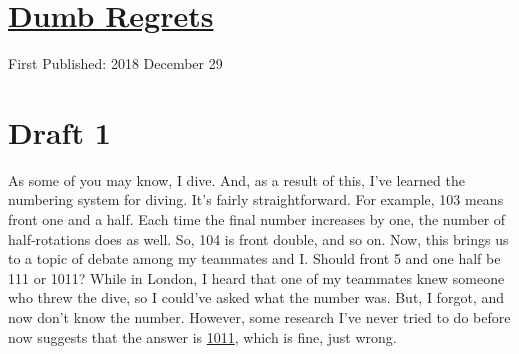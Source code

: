 \documentclass[12pt]{article}[titlepage]
\newcommand{\1}{\={a}}
\newcommand{\2}{\={e}}
\newcommand{\3}{\={\i}}
\newcommand{\4}{\=o}
\newcommand{\5}{\=u}
\newcommand{\6}{\={A}}
\renewcommand{\,}{\textsuperscript{,}}
\begin{document}
\doublespacing
\section{\href{dumb-regrets.html}{Dumb Regrets}}
First Published: 2018 December 29
\section{Draft 1}
As some of you may know, I dive.
And, as a result of this, I've learned the numbering system for diving.
It's fairly straightforward.
For example, 103 means front one and a half.
Each time the final number increases by one, the number of half-rotations does as well.
So, 104 is front double, and so on.
Now, this brings us to a topic of debate among my teammates and I.
Should front 5 and one half be 111 or 1011?
While in London, I heard that one of my teammates knew someone who threw the dive, so I could've asked what the number was.
But, I forgot, and now don't know the number.
However, some research I've never tried to do before now suggests that the answer is \href{https://www.ncbi.nlm.nih.gov/pubmed/27418210}{1011}, which is fine, just wrong.
\end{document}
